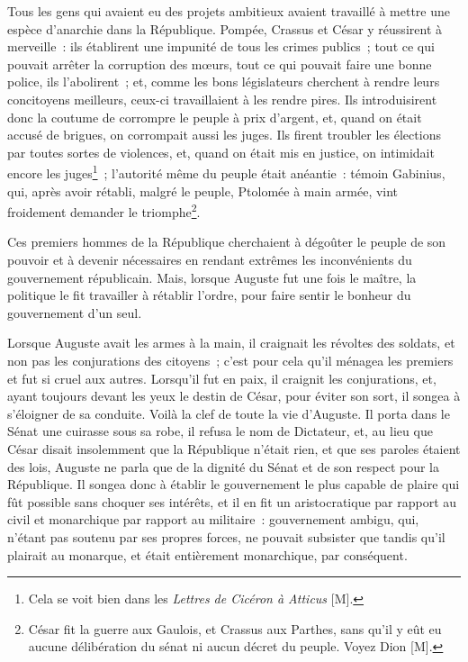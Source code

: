 \documentclass[french,twoside]{book} %
\begin{document}
Tous les gens qui avaient eu des projets ambitieux avaient travaillé à mettre une espèce d’anarchie dans la République. Pompée, Crassus et César y réussirent à merveille : ils établirent une impunité de tous les crimes publics ; tout ce qui pouvait arrêter la corruption des mœurs, tout ce qui pouvait faire une bonne police, ils l’abolirent ; et, comme les bons législateurs cherchent à rendre leurs concitoyens meilleurs, ceux-ci travaillaient à les rendre pires. Ils introduisirent donc la coutume de corrompre le peuple à prix d’argent, et, quand on était accusé de brigues, on corrompait aussi les juges. Ils firent troubler les élections par toutes sortes de violences, et, quand on était mis en justice, on intimidait encore les juges\footnote{Cela se voit bien dans les {\itshape Lettres de Cicéron à Atticus} [M].} ; l’autorité même du peuple était anéantie : témoin Gabinius, qui, après avoir rétabli, malgré le peuple, Ptolomée à main armée, vint froidement demander le triomphe\footnote{César fit la guerre aux Gaulois, et Crassus aux Parthes, sans qu’il y eût eu aucune délibération du sénat ni aucun décret du peuple. Voyez Dion [M].}.\par
Ces premiers hommes de la République cherchaient à dégoûter le peuple de son pouvoir et à devenir nécessaires en rendant extrêmes les inconvénients du gouvernement républicain. Mais, lorsque Auguste fut une fois le maître, la politique le fit travailler à rétablir l’ordre, pour faire sentir le bonheur du gouvernement d’un seul.\par
Lorsque Auguste avait les armes à la main, il craignait les révoltes des soldats, et non pas les conjurations des citoyens ; c’est pour cela qu’il ménagea les premiers et fut si cruel aux autres. Lorsqu’il fut en paix, il craignit les conjurations, et, ayant toujours devant les yeux le destin de César, pour éviter son sort, il songea à s’éloigner de sa conduite. Voilà la clef de toute la vie d’Auguste. Il porta dans le Sénat une cuirasse sous sa robe, il refusa le nom de Dictateur, et, au lieu que César disait insolemment que la République n’était rien, et que ses paroles étaient des lois, Auguste ne parla que de la dignité du Sénat et de son respect pour la République. Il songea donc à établir le gouvernement le plus capable de plaire qui fût possible sans choquer ses intérêts, et il en fit un aristocratique par rapport au civil et monarchique par rapport au militaire : gouvernement ambigu, qui, n’étant pas soutenu par ses propres forces, ne pouvait subsister que tandis qu’il plairait au monarque, et était entièrement monarchique, par conséquent.\par
\end{document}

